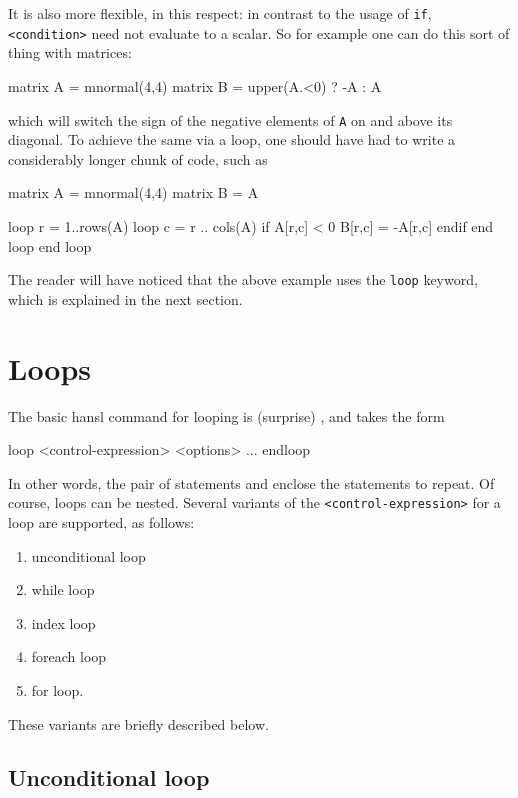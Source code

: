 It is also
more flexible, in this respect: in contrast to the usage of
\texttt{if}, \texttt{<condition>} need not evaluate to a scalar.  So
for example one can do this sort of thing with matrices:
\begin{code}
matrix A = mnormal(4,4)
matrix B = upper(A.<0) ? -A : A
\end{code}
which will switch the sign of the negative elements of \texttt{A} on
and above its diagonal. To achieve the same via a loop, one should
have had to write a considerably longer chunk of code, such as
\begin{code}
matrix A = mnormal(4,4)
matrix B = A

loop r = 1..rows(A)
  loop c = r .. cols(A)
     if A[r,c] < 0
       B[r,c] = -A[r,c]
     endif
  end loop
end loop
\end{code}

The reader will have noticed that the above example uses the
\texttt{loop} keyword, which is explained in the next section.

\section{Loops}
\label{sec:hr-loops}

The basic hansl command for looping is (surprise) , and
takes the form
\begin{code}
loop <control-expression> <options>
    ...
endloop
\end{code}
In other words, the pair of statements  and 
enclose the statements to repeat. Of course, loops can be nested.
Several variants of the \texttt{<control-expression>} for a loop are
supported, as follows:
\begin{enumerate}
\item unconditional loop
\item while loop
\item index loop
\item foreach loop
\item for loop.
\end{enumerate}
These variants are briefly described below.

\subsection{Unconditional loop}

